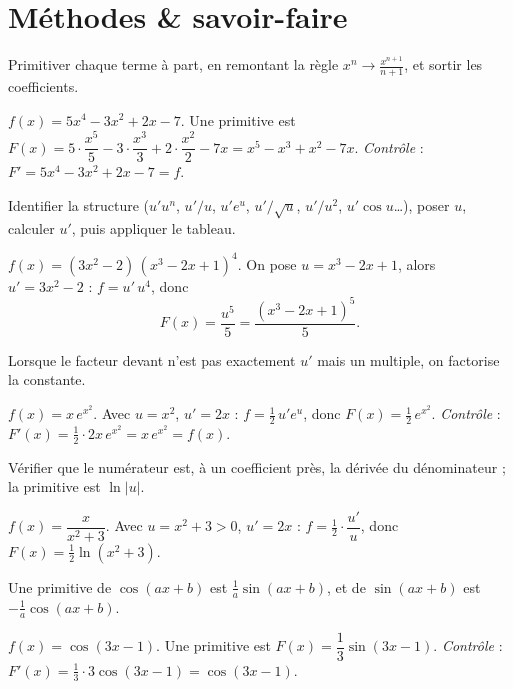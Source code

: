 \section{Méthodes \& savoir-faire}

Primitiver chaque terme à part, en remontant la règle $x^{n}\to\frac{x^{n+1}}{n+1}$, et sortir les coefficients.
\begin{exemple}
$f(x)=5x^{4}-3x^{2}+2x-7$. Une primitive est
$F(x)=5\cdot\dfrac{x^{5}}{5}-3\cdot\dfrac{x^{3}}{3}+2\cdot\dfrac{x^{2}}{2}-7x=x^{5}-x^{3}+x^{2}-7x$.
\emph{Contrôle} : $F'=5x^{4}-3x^{2}+2x-7=f$. \checkmark
\end{exemple}

Identifier la structure ($u'u^{n}$, $u'/u$, $u'e^{u}$, $u'/\sqrt u$, $u'/u^{2}$, $u'\cos u$\dots),
poser $u$, calculer $u'$, puis appliquer le tableau.
\begin{exemple}
$f(x)=(3x^{2}-2)\,(x^{3}-2x+1)^{4}$. On pose $u=x^{3}-2x+1$, alors $u'=3x^{2}-2$ :
$f=u'\,u^{4}$, donc
\[
F(x)=\frac{u^{5}}{5}=\frac{(x^{3}-2x+1)^{5}}{5}.
\]
\end{exemple}

Lorsque le facteur devant n'est pas exactement $u'$ mais un multiple, on factorise la constante.
\begin{exemple}
$f(x)=x\,e^{x^{2}}$. Avec $u=x^{2}$, $u'=2x$ : $f=\tfrac12\,u'e^{u}$, donc $F(x)=\tfrac12\,e^{x^{2}}$.
\emph{Contrôle} : $F'(x)=\tfrac12\cdot2x\,e^{x^{2}}=x\,e^{x^{2}}=f(x)$. \checkmark
\end{exemple}

Vérifier que le numérateur est, à un coefficient près, la dérivée du dénominateur ; la primitive est $\ln|u|$.
\begin{exemple}
$f(x)=\dfrac{x}{x^{2}+3}$. Avec $u=x^{2}+3>0$, $u'=2x$ : $f=\tfrac12\cdot\dfrac{u'}{u}$,
donc $F(x)=\tfrac12\ln(x^{2}+3)$.
\end{exemple}

Une primitive de $\cos(ax+b)$ est $\frac1a\sin(ax+b)$, et de $\sin(ax+b)$ est $-\frac1a\cos(ax+b)$.
\begin{exemple}
$f(x)=\cos(3x-1)$. Une primitive est $F(x)=\dfrac13\sin(3x-1)$.
\emph{Contrôle} : $F'(x)=\tfrac13\cdot3\cos(3x-1)=\cos(3x-1)$. \checkmark
\end{exemple}

